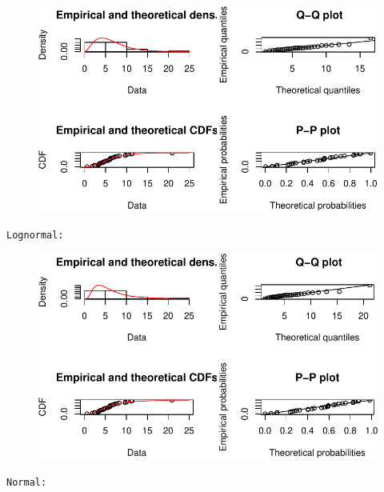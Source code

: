 \documentclass[
  letterpaper,
  DIV=11,
  numbers=noendperiod]{scrartcl}
\begin{document}
\begin{figure}[H]

{\centering \includegraphics{quiz5_files/figure-pdf/unnamed-chunk-31-3.pdf}

}

\end{figure}

\begin{verbatim}
Lognormal: 
\end{verbatim}

\begin{figure}[H]

{\centering \includegraphics{quiz5_files/figure-pdf/unnamed-chunk-31-4.pdf}

}

\end{figure}

\begin{verbatim}
Normal: 
\end{verbatim}
\end{document}
